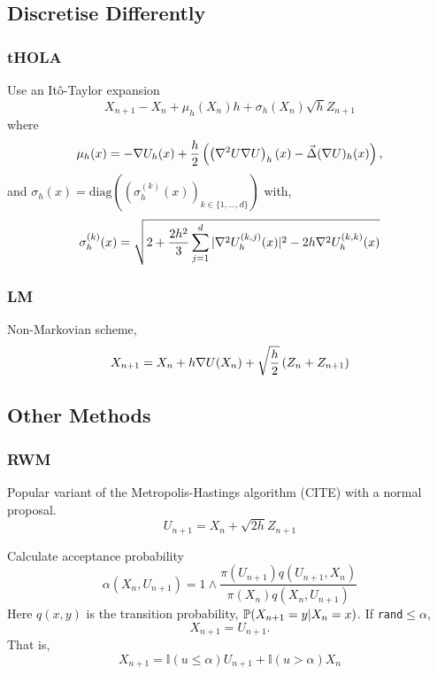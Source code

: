 \subsection{Discretise Differently}
\subsubsection{tHOLA}
\cite{tHOLA}
Use an It\^o-Taylor expansion 
\[X_{n+1} - X_n + \mu_{h}(X_n)h +\sigma_{h}(X_n)\sqrt{h}Z_{n+1}\]
where 
\[\mu_{h}(x) = -\grad U_{h}(x) +\frac{h}{2}\left( \left( \grad^2U\grad U\right)_{h}(x) - \vec{\Delta}(\grad U)_{h}(x)\right) ,\]
and \(\sigma_{h}(x) = \text{diag}\left(\left( \sigma_{h}^{(k)}(x)\right)_{k\in \lbrace 1,\dots,d\rbrace}\right)\) with,
\[\sigma_{h}^{(k)}(x) = \sqrt{2+\frac{2h^2}{3}\sum_{j=1}^d |\grad^2 U_{h}^{(k,j)}(x)|^2 - 2h \grad^2 U_{h}^{(k,k)}(x)}\]

\subsubsection{LM}
\cite{LM}
Non-Markovian scheme,
\[X_{n+1} = X_n +h \grad U(X_n) + \sqrt{\frac{h}{2}} \left(Z_n + Z_{n+1}\right) \]


\subsection{Other Methods}
\subsubsection{RWM}
Popular variant of the Metropolis-Hastings algorithm (CITE) with a normal proposal. 
\[U_{n+1} = X_n + \sqrt{2h} Z_{n+1}\]

Calculate acceptance probability
\[\alpha(X_n,U_{n+1}) = 1\wedge \frac{\pi(U_{n+1})q(U_{n+1},X_n)}{\pi(X_n)q(X_n,U_{n+1})}\]
Here \(q(x,y)\) is the transition probability, \(\P(X_{n+1}=y | X_{n}=x)\). If \texttt{rand}\(\leq\alpha\), 
\[X_{n+1} = U_{n+1}.\]
That is,
\[X_{n+1} = \mathbb{I}(u\leq \alpha)U_{n+1} +\mathbb{I}(u > \alpha)X_n \] 

